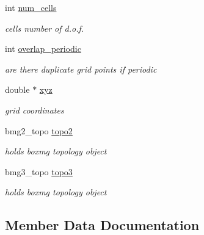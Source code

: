 \begin{DoxyCompactItemize}
int \mbox{\hyperlink{structstella__grid_afd6a2ee54de531c805cc15b644491d9f}{num\+\_\+cells}}
\begin{DoxyCompactList}\small\item\em cells number of d.\+o.\+f. \end{DoxyCompactList}\item 
\mbox{\label{structstella__grid_ab8330b0c4c1613de977e5debdb94eff0}} 
int \mbox{\hyperlink{structstella__grid_ab8330b0c4c1613de977e5debdb94eff0}{overlap\+\_\+periodic}}
\begin{DoxyCompactList}\small\item\em are there duplicate grid points if periodic \end{DoxyCompactList}\item 
\mbox{\label{structstella__grid_a26cdb92edaa442067ef07100540086db}} 
double $\ast$ \mbox{\hyperlink{structstella__grid_a26cdb92edaa442067ef07100540086db}{xyz}}
\begin{DoxyCompactList}\small\item\em grid coordinates \end{DoxyCompactList}\item 
\mbox{\label{structstella__grid_a70fcd94b96ca2c8ee112869b8520810e}} 
bmg2\+\_\+topo \mbox{\hyperlink{structstella__grid_a70fcd94b96ca2c8ee112869b8520810e}{topo2}}
\begin{DoxyCompactList}\small\item\em holds boxmg topology object \end{DoxyCompactList}\item 
\mbox{\label{structstella__grid_a64182c35fb75c6b7efc4bbf1a538c6fd}} 
bmg3\+\_\+topo \mbox{\hyperlink{structstella__grid_a64182c35fb75c6b7efc4bbf1a538c6fd}{topo3}}
\begin{DoxyCompactList}\small\item\em holds boxmg topology object \end{DoxyCompactList}\end{DoxyCompactItemize}


\subsection{Member Data Documentation}
\mbox{\label{structstella__grid_afd6a2ee54de531c805cc15b644491d9f}} 
